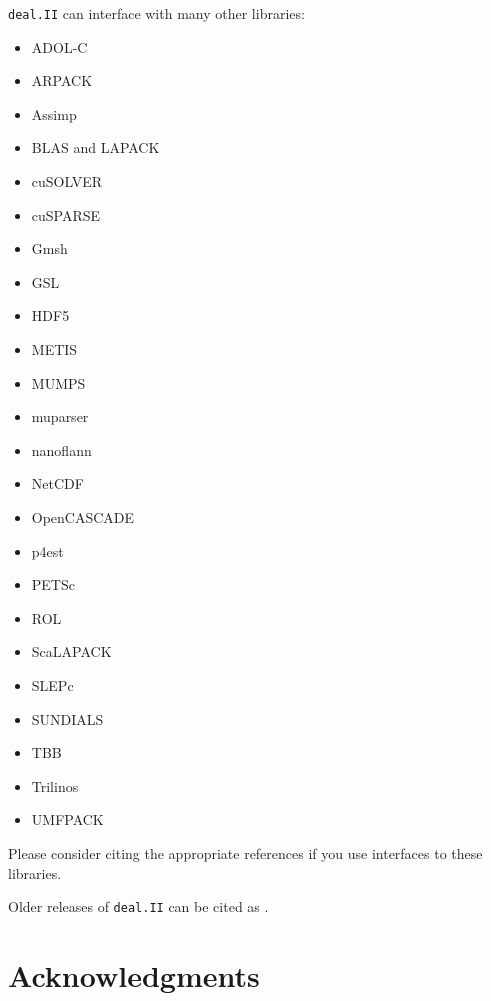 \documentclass{ansarticle-preprint}
\newcommand{\specialword}[1]{\texttt{#1}}
\newcommand{\dealii}{{\specialword{deal.II}}\xspace}
\begin{document}
\dealii can interface with many other libraries:
\begin{multicols}{3}
\begin{itemize}
\item ADOL-C \cite{Griewank1996a,adol-c}
\item ARPACK \cite{arpack}
\item Assimp \cite{assimp}
\item BLAS and LAPACK \cite{lapack}
\item cuSOLVER \cite{cusolver}
\item cuSPARSE \cite{cusparse}
\item Gmsh \cite{geuzaine2009gmsh}
\item GSL \cite{gsl2016}
\item HDF5 \cite{hdf5}
\item METIS \cite{karypis1998fast}
\item MUMPS \cite{ADE00,MUMPS:1,MUMPS:2,mumps-web-page}
\item muparser \cite{muparser-web-page}
\item nanoflann \cite{nanoflann}
\item NetCDF \cite{rew1990netcdf}
\item OpenCASCADE \cite{opencascade-web-page}
\item p4est \cite{p4est}
\item PETSc \cite{petsc-user-ref,petsc-web-page}
\item ROL \cite{ridzal2014rapid}
\item ScaLAPACK \cite{slug}
\item SLEPc \cite{Hernandez:2005:SSF}
\item SUNDIALS \cite{sundials}
\item TBB \cite{Rei07}
\item Trilinos \cite{trilinos,trilinos-web-page}
\item UMFPACK \cite{umfpack}
\end{itemize}
\end{multicols}
Please consider citing the appropriate references if you use interfaces to these
libraries.

Older releases of \dealii can be cited as
\cite{dealII80,dealII81,dealII82,dealII83,dealII84,dealII85}.

\nocite{BangerthKanschat1999}

\section{Acknowledgments}
\end{document}
